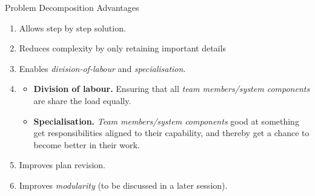 \documentclass{beamer}
\begin{document}
\begin{frame}[fragile]{Problem Decomposition}
{Advantages}

\begin{enumerate}
\item Allows step by step solution.
\item Reduces complexity by only retaining important details
\item Enables \emph{division-of-labour} and \emph{specialisation}.
\item
\begin{scriptsize}
\begin{itemize}
\item \textbf{Division of labour.} Ensuring that all \emph{team members/system components} are share the load equally.
\item \textbf{Specialisation.} \emph{Team members/system components} good at something get responsibilities aligned to their capability, and thereby get a chance to become better in their work.
\end{itemize}
\end{scriptsize}
\item Improves plan revision.
\item Improves \emph{modularity} (to be discussed in a later session).
\end{enumerate}
\end{frame}

\begin{frame}
\end{frame}
\end{document}
